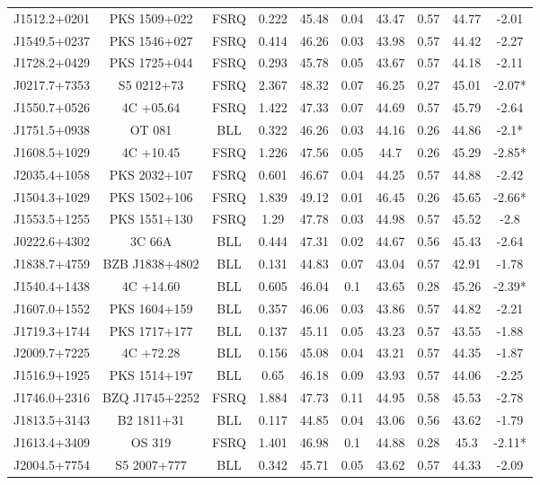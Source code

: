 \documentclass[12pt]{article}
\begin{document}
\begin{landscape}
\begin{longtable}{cccccccccc}
J1512.2+0201 & PKS 1509+022 & FSRQ & 0.222 & 45.48 & 0.04 & 43.47 & 0.57 & 44.77 & -2.01 \\
J1549.5+0237 & PKS 1546+027 & FSRQ & 0.414 & 46.26 & 0.03 & 43.98 & 0.57 & 44.42 & -2.27 \\
J1728.2+0429 & PKS 1725+044 & FSRQ & 0.293 & 45.78 & 0.05 & 43.67 & 0.57 & 44.18 & -2.11 \\
J0217.7+7353 & S5 0212+73 & FSRQ & 2.367 & 48.32 & 0.07 & 46.25 & 0.27 & 45.01 & -2.07* \\
J1550.7+0526 & 4C +05.64 & FSRQ & 1.422 & 47.33 & 0.07 & 44.69 & 0.57 & 45.79 & -2.64 \\
J1751.5+0938 & OT 081 & BLL & 0.322 & 46.26 & 0.03 & 44.16 & 0.26 & 44.86 & -2.1* \\
J1608.5+1029 & 4C +10.45 & FSRQ & 1.226 & 47.56 & 0.05 & 44.7 & 0.26 & 45.29 & -2.85* \\
J2035.4+1058 & PKS 2032+107 & FSRQ & 0.601 & 46.67 & 0.04 & 44.25 & 0.57 & 44.88 & -2.42 \\
J1504.3+1029 & PKS 1502+106 & FSRQ & 1.839 & 49.12 & 0.01 & 46.45 & 0.26 & 45.65 & -2.66* \\
J1553.5+1255 & PKS 1551+130 & FSRQ & 1.29 & 47.78 & 0.03 & 44.98 & 0.57 & 45.52 & -2.8 \\
J0222.6+4302 & 3C 66A & BLL & 0.444 & 47.31 & 0.02 & 44.67 & 0.56 & 45.43 & -2.64 \\
J1838.7+4759 & BZB J1838+4802 & BLL & 0.131 & 44.83 & 0.07 & 43.04 & 0.57 & 42.91 & -1.78 \\
J1540.4+1438 & 4C +14.60 & BLL & 0.605 & 46.04 & 0.1 & 43.65 & 0.28 & 45.26 & -2.39* \\
J1607.0+1552 & PKS 1604+159 & BLL & 0.357 & 46.06 & 0.03 & 43.86 & 0.57 & 44.82 & -2.21 \\
J1719.3+1744 & PKS 1717+177 & BLL & 0.137 & 45.11 & 0.05 & 43.23 & 0.57 & 43.55 & -1.88 \\
J2009.7+7225 & 4C +72.28 & BLL & 0.156 & 45.08 & 0.04 & 43.21 & 0.57 & 44.35 & -1.87 \\
J1516.9+1925 & PKS 1514+197 & BLL & 0.65 & 46.18 & 0.09 & 43.93 & 0.57 & 44.06 & -2.25 \\
J1746.0+2316 & BZQ J1745+2252 & FSRQ & 1.884 & 47.73 & 0.11 & 44.95 & 0.58 & 45.53 & -2.78 \\
J1813.5+3143 & B2 1811+31 & BLL & 0.117 & 44.85 & 0.04 & 43.06 & 0.56 & 43.62 & -1.79 \\
J1613.4+3409 & OS 319 & FSRQ & 1.401 & 46.98 & 0.1 & 44.88 & 0.28 & 45.3 & -2.11* \\
J2004.5+7754 & S5 2007+777 & BLL & 0.342 & 45.71 & 0.05 & 43.62 & 0.57 & 44.33 & -2.09 \\

\end{longtable}
\end{landscape}
\end{document}
